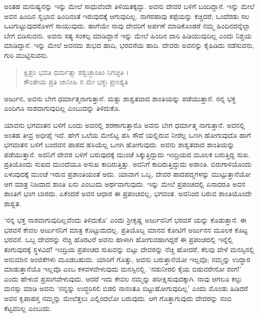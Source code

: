 ಅಂತಹ ಮನುಷ್ಯನನ್ನು ಇನ್ನು ಮೇಲೆ ಸಾಧುವೆಂದೇ ತಿಳಿಯತಕ್ಕದ್ದು. ಅವನು ದೇವರ ಬಳಿಗೆ ಬಂದಿದ್ದಾನೆ. ಇನ್ನು ಮೇಲೆ ಅವನ ಹಿಂದಿನ ಸ್ವಭಾವ ಹಿಂದಿನಂತೆ ಇರುವುದಕ್ಕೆ ಆಗುವುದಿಲ್ಲ. ನಾಗರಹಾವು ಕಪ್ಪೆಯನ್ನು ಕಚ್ಚಿದರೆ, ಒಂದೆರಡು ಸಲ ಒಟಗುಟ್ಟುವುದರೊಳಗೆ ಸಾಯುವುದು. ಹಾಗೆಯೇ ನಾವು ದೇವರಿಗೆ ಅರ್ಪಣೆ ಮಾಡಿಕೊಂಡರೆ ನಮ್ಮ ಹಿಂದಿನದನ್ನೆಲ್ಲಾ ಬೇಗ ಬಿಡಿಸುವನು. ಅವನು ಸತ್ಯ ಸಂಕಲ್ಪ ಮಾಡಿದ್ದಾನೆ ಇನ್ನು ಮೇಲೆ ಹಿಂದಿನ ದಾರಿ ಹಿಡಿಯುವುದಿಲ್ಲ ಎಂದು ನಿಶ್ಚಯ ಮಾಡಿದ್ದಾನೆ. ಇನ್ನು ಮೇಲೆ ಅವನದು ಶುಭದ ಹಾದಿ, ಭರವಸೆಯ ಹಾದಿ. ದೇವರು ಅವನನ್ನು ಕೈಹಿಡಿದು ನಡೆಸುವನು, ಗುರಿ ಮುಟ್ಟಿಸುವನು.

\begin{verse}
ಕ್ಷಿಪ್ರಂ ಭವತಿ ಧರ್ಮತ್ಮಾ ಶಶ್ವಚ್ಛಾಂತಿಂ ನಿಗಚ್ಛತಿ ।\\ಕೌಂತೇಯ ಪ್ರತಿ ಜಾನೀಹಿ ನ ಮೇ ಭಕ್ತಃ ಪ್ರಣಶ್ಯತಿ 
\end{verse}

{\small ಅರ್ಜುನ, ಅವನು ಬೇಗ ಧರ್ಮಾತ್ಮನಾಗುತ್ತಾನೆ. ಮತ್ತು ಶಾಶ್ವತವಾದ ಶಾಂತಿಯನ್ನು ಪಡೆಯುತ್ತಾನೆ. ನನ್ನ ಭಕ್ತ ಎಂದಿಗೂ ನಾಶವಾಗುವುದಿಲ್ಲ ಎಂಬುದನ್ನು ತಿಳಿದುಕೊ.}

ಯಾವನು ಭಗವಂತನ ಬಳಿಗೆ ಬಂದು ಅವನಲ್ಲಿ ಶರಣಾಗುತ್ತಾನೊ ಅವನು ಬೇಗ ಧರ್ಮಾತ್ಮ ನಾಗುತ್ತಾನೆ. ಅವನಲ್ಲಿ ಅಂತಹ ತೀವ್ರ ಅಭೀಪ್ಸೆ ಇದೆ. ಹೇಗೆ ಒಲೆಯ ಮೇಲಿಟ್ಟ ಹಸಿ ಸೌದೆ ಯಲ್ಲಿರುವ ನೀರೆಲ್ಲ ಒಣಗಿ ಹೋಗುವುದೊ ಹಾಗೆ ಭಗವಂತನ ಬಳಿಗೆ ಬಂದವನ ಪಾಪದ ಹಸಿಯೆಲ್ಲ ಒಣಗಿ ಹೋಗುವುದು. ಅವನು ಶಾಶ್ವತವಾದ ಶಾಂತಿಯನ್ನು ಪಡೆಯುತ್ತಾನೆ. ಅವನಿಗೆ ದೇವರ ಬಳಿಗೆ ಬರುವುದಕ್ಕೆ ಮುಂಚೆ ಸಿಕ್ಕುತ್ತಿದ್ದುದು ಇಂದ್ರಿಯದ ಮೂಲಕ ಬರುತ್ತಿದ್ದ ಸುಖ. ಪ್ರತಿಯೊಂದು ಸುಖದ ಮುಂದೆಯೂ ಅಸುಖ ಕಾದಿರುತ್ತಿತ್ತು. ಅವನಿಗೆ ಕಾದಿರುತ್ತಿದ್ದುದು ಅಶಾಂತಿ. ಬಿರುಗಾಳಿಯೊಂದು ಏಳುವುದಕ್ಕೆ ಮುಂಚೆ ಇರುವ ಪ್ರಶಾಂತಿಯಂತೆ ಅದು. ಯಾವಾಗ ಒಬ್ಬ, ದೇವರ ಪಾದಪದ್ಮಗಳನ್ನು ಮುಟ್ಟುತ್ತಾನೆಯೋ ಆಗ ಮಾತ್ರ ನಿಜವಾದ ಶಾಂತಿ ಏನು ಎಂಬುದು ಅರ್ಥವಾಗುವುದು. ಇನ್ನು ಮೇಲೆ ಪ್ರಪಂಚದಲ್ಲಿ ಏನಾದರೂ ಅವನ ಶಾಂತಿಗೆ ಭಂಗ ಬಾರದು. ಏಕೆಂದರೆ ಅವನ ಆಧಾರ ಈ ಪ್ರಪಂಚವಲ್ಲ, ಭಗವಂತ. ಅವನಿಂದ ಬರುವ ಶಾಂತಿಯೊಂದೇ ಶಾಶ್ವತ.

‘ನನ್ನ ಭಕ್ತ ನಾಶವಾಗುವುದಿಲ್ಲವೆಂದು ತಿಳಿದುಕೊ’ ಎಂದು ಶ್ರೀಕೃಷ್ಣ ಅರ್ಜುನನಿಗೆ ಭರವಸೆ ಯನ್ನು ಕೊಡುತ್ತಾನೆ. ಈ ಭರವಸೆ ಕೇವಲ ಅರ್ಜುನನಿಗೆ ಮಾತ್ರ ಕೊಟ್ಟುದುದಲ್ಲ. ಪ್ರತಿಯೊಬ್ಬ ಮಾನವ ಕೋಟಿಗೆ ಅರ್ಜುನನ ಮೂಲಕ ಕೊಟ್ಟ ಭರವಸೆ. ಒಬ್ಬ ದೇವರನ್ನು ನೆಚ್ಚಿ ಹೊರಟರೆ ಅವನು ಹಾಳಾಗಿ ಹೋಗುವಹಾಗಿದ್ದರೆ ಈ ಪ್ರಪಂಚದಲ್ಲಿ ಇನ್ನೆಲ್ಲಿ ತಂಗುವುದಕ್ಕೆ ಸ್ಥಳವಿದೆ! ಇಂದ್ರಿಯ ಪ್ರಪಂಚದ ಸುಖವನ್ನು ಬಿಟ್ಟು ದೇವರನ್ನು ನೆಚ್ಚಿ ಹೋದರೆ, ಕೆಲವು ವೇಳೆ ಮನಸ್ಸಿನಲ್ಲಿ ಅನುಮಾನ ಅಂಜಿಕೆಗಳು ಮೂಡಬಹುದು. ಯಾರಿಗೆ ಗೊತ್ತು, ಅವನು ಬರುತ್ತಾನೆಯೋ ಇಲ್ಲವೊ; ನಮ್ಮನ್ನು ಉದ್ಧಾರ ಮಾಡುತ್ತಾನೆಯೊ ಇಲ್ಲವೊ ಎಂಬ ಕಳವಳವೇಳುವುದು ಮನಸ್ಸಿನಲ್ಲಿ. ‘ನಡುನೀರಲಿ ಕೈಯ ಬಿಡುವರೇನೋ ರಂಗ!’ ಎಂದು ಹೇಳುವ ಪ್ರಸಂಗವೇಳುವುದು. ಆದರೆ ಇದು ಕೇವಲ ನಮ್ಮನ್ನು ಪರೀಕ್ಷಿಸುವುದಕ್ಕಾಗಿ. ನಾವು ಆಗಲೂ ಕಲ್ಲು ಮನಸ್ಸು ಮಾಡಿ ಅವನು ‘ನನ್ನನ್ನು ಉದ್ಧರಿಸಲಿ ಬಿಡಲಿ ನಾನಂತೂ ಬಿಟ್ಟುಹೋಗುವುದಿಲ್ಲ’ ಎಂದು ಮೊಂಡು ಹಿಡಿದರೆ ಅವನ ಕೃಪಾಹಸ್ತ ನಮ್ಮನ್ನು ಮೇಲೆತ್ತಲು ಎಲ್ಲಿಂದಲೋ ಬರುವುದು. ಆಗ ಗೊತ್ತಾಗುವುದು ದೇವರನ್ನು ನಂಬಿ ಕೆಟ್ಟವರಿಲ್ಲ ಎಂಬುದು.

